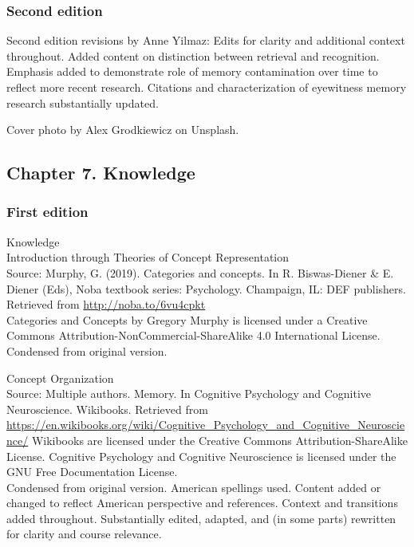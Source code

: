\documentclass[
]{krantz}
\begin{document}
\subsubsection*{Second edition}\label{second-edition-6}


Second edition revisions by Anne Yilmaz: Edits for clarity and additional context throughout. Added content on distinction between retrieval and recognition. Emphasis added to demonstrate role of memory contamination over time to reflect more recent research. Citations and characterization of eyewitness memory research substantially updated.

Cover photo by Alex Grodkiewicz on Unsplash.

\subsection*{Chapter 7. Knowledge}\label{chapter-7.-knowledge}


\subsubsection*{First edition}\label{first-edition-7}


Knowledge\\
Introduction through Theories of Concept Representation\\
Source: Murphy, G. (2019). Categories and concepts. In R. Biswas-Diener \& E. Diener (Eds), Noba textbook series: Psychology. Champaign, IL: DEF publishers. Retrieved from \url{http://noba.to/6vu4cpkt}\\
Categories and Concepts by Gregory Murphy is licensed under a Creative Commons Attribution-NonCommercial-ShareAlike 4.0 International License.\\
Condensed from original version.

Concept Organization\\
Source: Multiple authors. Memory. In Cognitive Psychology and Cognitive Neuroscience. Wikibooks. Retrieved from \url{https://en.wikibooks.org/wiki/Cognitive_Psychology_and_Cognitive_Neuroscience/}
Wikibooks are licensed under the Creative Commons Attribution-ShareAlike License.
Cognitive Psychology and Cognitive Neuroscience is licensed under the GNU Free Documentation License.\\
Condensed from original version. American spellings used. Content added or changed to reflect American perspective and references. Context and transitions added throughout. Substantially edited, adapted, and (in some parts) rewritten for clarity and course relevance.
\end{document}
